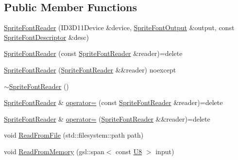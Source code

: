\subsection*{Public Member Functions}
\begin{DoxyCompactItemize}
\item 
\mbox{\hyperlink{classmage_1_1rendering_1_1loader_1_1_sprite_font_reader_a5cef04ca33ef0047664fa757de6e1b8f}{Sprite\+Font\+Reader}} (I\+D3\+D11\+Device \&device, \mbox{\hyperlink{structmage_1_1rendering_1_1_sprite_font_output}{Sprite\+Font\+Output}} \&output, const \mbox{\hyperlink{classmage_1_1rendering_1_1_sprite_font_descriptor}{Sprite\+Font\+Descriptor}} \&desc)
\item 
\mbox{\hyperlink{classmage_1_1rendering_1_1loader_1_1_sprite_font_reader_a4c96a8d3554084baaf4b24f94a582ac6}{Sprite\+Font\+Reader}} (const \mbox{\hyperlink{classmage_1_1rendering_1_1loader_1_1_sprite_font_reader}{Sprite\+Font\+Reader}} \&reader)=delete
\item 
\mbox{\hyperlink{classmage_1_1rendering_1_1loader_1_1_sprite_font_reader_a71239906b4c7609747d5fe47189883b6}{Sprite\+Font\+Reader}} (\mbox{\hyperlink{classmage_1_1rendering_1_1loader_1_1_sprite_font_reader}{Sprite\+Font\+Reader}} \&\&reader) noexcept
\item 
\mbox{\hyperlink{classmage_1_1rendering_1_1loader_1_1_sprite_font_reader_a206d696476cd2ed6606932c549cd0c6c}{$\sim$\+Sprite\+Font\+Reader}} ()
\item 
\mbox{\hyperlink{classmage_1_1rendering_1_1loader_1_1_sprite_font_reader}{Sprite\+Font\+Reader}} \& \mbox{\hyperlink{classmage_1_1rendering_1_1loader_1_1_sprite_font_reader_a645988b6bba2a4fda93d18c4c9e3d09c}{operator=}} (const \mbox{\hyperlink{classmage_1_1rendering_1_1loader_1_1_sprite_font_reader}{Sprite\+Font\+Reader}} \&reader)=delete
\item 
\mbox{\hyperlink{classmage_1_1rendering_1_1loader_1_1_sprite_font_reader}{Sprite\+Font\+Reader}} \& \mbox{\hyperlink{classmage_1_1rendering_1_1loader_1_1_sprite_font_reader_ac6902b3475ae8425d475de59135a11a3}{operator=}} (\mbox{\hyperlink{classmage_1_1rendering_1_1loader_1_1_sprite_font_reader}{Sprite\+Font\+Reader}} \&\&reader)=delete
\item 
void \mbox{\hyperlink{classmage_1_1rendering_1_1loader_1_1_sprite_font_reader_a0308b90e3cf888d383a228cfe8827972}{Read\+From\+File}} (std\+::filesystem\+::path path)
\item 
void \mbox{\hyperlink{classmage_1_1rendering_1_1loader_1_1_sprite_font_reader_afc48490dca5042078726a1ec3fe7abe7}{Read\+From\+Memory}} (gsl\+::span$<$ const \mbox{\hyperlink{namespacemage_a30677c03d683c4c35630c25f6ff3fb7f}{U8}} $>$ input)
\end{DoxyCompactItemize}
